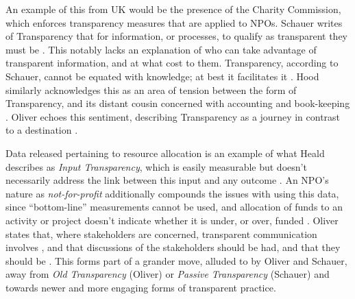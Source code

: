  An example of this from UK would be the presence of the Charity Commission, which enforces transparency measures that are applied to NPOs. Schauer writes of Transparency that for information, or processes, to qualify as transparent they must be  \cite{schauer_transparency_2011}. This notably lacks an explanation of who can take advantage of transparent information, and at what cost to them. Transparency, according to Schauer, cannot be equated with knowledge; at best it facilitates it \cite{schauer_transparency_2011}. Hood similarly acknowledges this as an area of tension between the  form of Transparency, and its distant cousin concerned with accounting and book-keeping \cite{hood_transparency_2006-1}. Oliver echoes this sentiment, describing Transparency as a journey in contrast to a destination \cite{oliver_what_2004}.

Data released pertaining to resource allocation is an example of what Heald describes as \textit{Input Transparency}, which is easily measurable but doesn't necessarily address the link between this input and any outcome \cite{heald_fiscal_2003, heald_varieties_2006}. An NPO's nature as \textit{not-for-profit} additionally compounds the issues with using this data, since ``bottom-line'' measurements cannot be used, and allocation of funds to an activity or project doesn't indicate whether it is under, or over, funded \cite{henderson_performance_2002}. Oliver states that, where stakeholders are concerned, transparent communication involves , and that discussions of the stakeholders  should be had, and that they should be  \cite{oliver_what_2004}. This forms part of a grander move, alluded to by Oliver and Schauer, away from \textit{Old Transparency} (Oliver) or \textit{Passive Transparency} (Schauer) and towards newer and more engaging forms of transparent practice.

